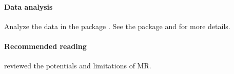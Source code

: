 \paragraph{Data analysis}\label{para::data-bmi-bmi}
Analyze the  data in the  package . See the package and \citet[][Section 7.2]{zhao2020statistical} for more details. 


 
 \paragraph{Recommended reading}

\citet{davey2003mendelian} reviewed the potentials and limitations of MR. 




